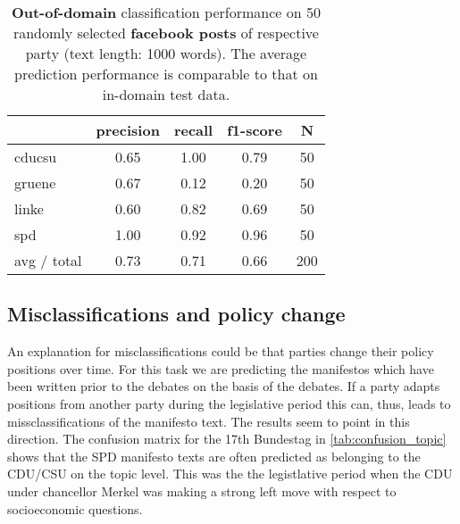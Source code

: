\documentclass[11pt]{article}
\begin{document}
\begin{table}[t]
\caption{
\label{tab:results_fb}
{\bf  Out-of-domain} classification performance on 50 randomly selected {\bf facebook posts} of respective party (text length: 1000 words). The average prediction performance is comparable to that on in-domain test data.}
\begin{center}
\begin{tabular}{lcccc}
    &         precision    &recall &  f1-score  & N  \\
    \hline
        \hline
 cducsu     &  0.65     & 1.00  &    0.79     &   50\\
     gruene   &    0.67   &   0.12  &    0.20   &     50\\
      linke       &0.60    &  0.82    &  0.69    &    50\\
        spd       &1.00 &     0.92   &   0.96    &    50\\
\hline
avg / total    &   0.73   &   0.71  &    0.66   &    200\\
\end{tabular}
\end{center}

\end{table}


\subsection{Misclassifications and policy change}
An explanation for misclassifications could be that parties change their policy positions over time. For this task we are predicting the manifestos which have been written prior to the debates on the basis of the debates. If a party adapts positions from another party during the legislative period this can, thus, leads to missclassifications of the manifesto text. The results seem to point in this direction. The confusion matrix for the 17th Bundestag in \autoref{tab:confusion_topic} shows that the SPD manifesto texts are often predicted as belonging to the CDU/CSU on the topic level. This was the the legistlative period when the CDU under chancellor Merkel was making a strong left move with respect to socioeconomic questions.\\
\end{document}
